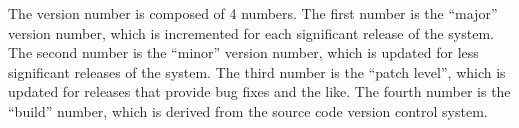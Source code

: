 
The version number is composed of 4 numbers.
The first number is the ``major'' version number, which is incremented for each significant release of the system.
The second number is the ``minor'' version number, which is updated for less significant releases of the system.
The third number is the ``patch level'', which is updated for releases that provide bug fixes and the like.
The fourth number is the ``build'' number, which is derived from the source code version control system.